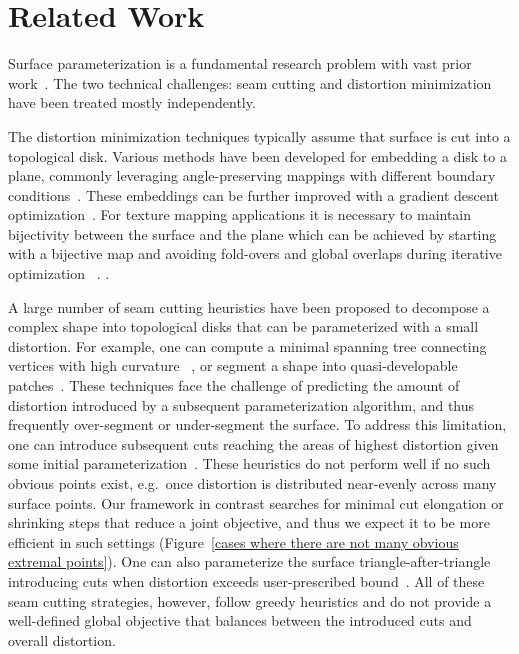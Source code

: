 
\section{Related Work}
Surface parameterization is a fundamental research problem with vast prior work~\cite{Hormann2008}. 
The two technical challenges: seam cutting and distortion minimization have been treated mostly independently. 

The distortion minimization techniques typically assume that surface is cut into a topological disk. Various methods
have been developed for embedding a disk to a plane, commonly leveraging angle-preserving mappings with different
boundary conditions~\cite{Floater2003,Sheffer2005ABFPP,Levy2002,Aigerman2015,Sawhney:2017}. 
These embeddings can be further improved with a gradient descent optimization~\cite{Hormann2000MIPS,Rabinovich2017,Zhu2017BCQN,Shtengel:GOvCM:2017}. 
For texture mapping applications it is necessary to maintain bijectivity between the surface and the plane 
which can be achieved by starting with a bijective map and avoiding fold-overs and global overlaps during iterative optimization ~\cite{Smith2015Bijective,Jiang2017}.
%
.

A large number of seam cutting heuristics have been proposed to decompose a complex shape into topological disks that can be
parameterized with a small distortion. For example, one can compute a minimal spanning tree connecting vertices with high curvature
~\cite{Sheffer2002Seamster}, or segment a shape into quasi-developable patches~\cite{Julius2005D}. These 
techniques face the challenge of predicting the amount of distortion introduced by a subsequent parameterization algorithm,
and thus frequently over-segment or under-segment the surface. 
%
To address this limitation, one can introduce subsequent cuts reaching the areas of highest distortion given some initial parameterization~\cite{Gu2002Geometry}.
%
These heuristics do not perform well if no such obvious points exist, e.g.\ once distortion is distributed near-evenly across many surface points. Our framework in contrast searches for minimal cut elongation or shrinking steps that reduce a joint objective, and thus we expect it to be more efficient in such settings (Figure~\ref{cases where there are not many obvious extremal points}).
%
One can also parameterize the surface triangle-after-triangle introducing cuts when distortion exceeds user-prescribed bound~\cite{BoundedDistortParam:2002}. 
%
All of these seam cutting strategies, however, follow greedy heuristics and do not provide a well-defined global objective that balances between the introduced cuts and overall distortion. 

